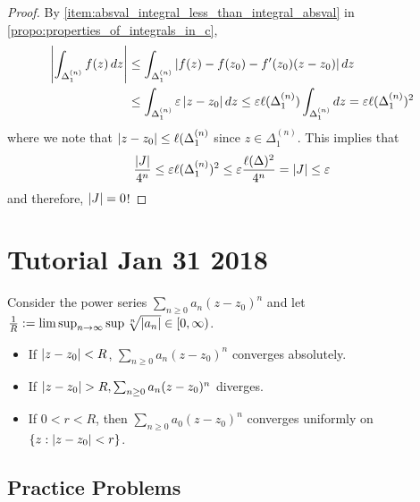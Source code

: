 \documentclass[notoc,notitlepage]{tufte-book}
\begin{document}
\begin{proof}
	By \cref{item:absval_integral_less_than_integral_absval} in \cref{propo:properties_of_integrals_in_c},
	\begin{align*}
		\left|\int_{\Delta_1^{(n)}} f(z) \mathop{}\!d{z}\right|
			&\leq \int_{\Delta_1^{(n)}} \left|f(z) - f(z_0) - f'(z_0)(z - z_0)\right| \mathop{}\!d{z} \\
			&\leq \int_{\Delta_1^{(n)}} \varepsilon \left|z - z_0\right| \mathop{}\!d{z} \leq \varepsilon \ell(\Delta_1^{(n)})\int_{\Delta_1^{(n)}} \mathop{}\!d{z} = \varepsilon \ell(\Delta_1^{(n)})^2
	\end{align*}
	where we note that $\left|z - z_0\right| \leq \ell(\Delta_1^{(n)}$ since $z \in \Delta_1^{(n)}$. This implies that
	\begin{align*}
		\frac{\left|J\right|}{4^n} \leq \varepsilon \ell(\Delta_1^{(n)})^2 \leq \varepsilon \frac{\ell(\Delta)^2}{4^n} = \left|J\right| \leq \varepsilon
	\end{align*}
	and therefore, $\left|J\right| = 0$!
\end{proof}	




\chapter*{Tutorial Jan 31 2018}

\begin{note}
	Consider the power series $\sum_{n \geq 0} a_n (z - z_0)^n$ and let $\frac{1}{R} := \limsup_{n \to \infty} \sup \sqrt[n]{\left|a_n\right|} \in [0, \infty)$.
	\begin{itemize}
		\item If $\left|z - z_0\right| < R$, $\sum_{n \geq 0} a_n (z - z_0)^n$ converges absolutely.
		\item If $\left|z - z_0\right| > R, \sum_{n \geq 0} a_n (z - z_0)^n$ diverges.
		\item If $0 < r < R$, then $\sum_{n \geq 0} a_0 (z - z_0)^n$ converges uniformly on $\{z : \left|z - z_0\right| < r\}$.
	\end{itemize}
\end{note}

\section{Practice Problems} %
\label{sec:practice_problems}
\end{document}
